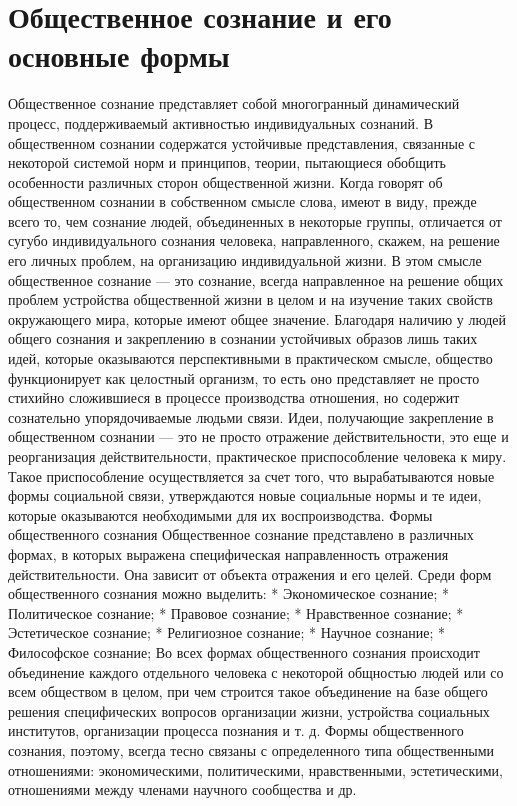 \documentclass[12pt]{article}
\begin{document}
\section{Общественное сознание и его основные формы}
Общественное  сознание  представляет  собой  многогранный  динамический  процесс,  поддерживаемый
активностью  индивидуальных  сознаний.  В  общественном  сознании  содержатся  устойчивые  представления,
связанные с некоторой системой норм и принципов, теории, пытающиеся обобщить особенности различных
сторон общественной жизни. Когда говорят об общественном сознании в собственном смысле слова, имеют в
виду,  прежде  всего  то,  чем  сознание  людей,  объединенных  в  некоторые  группы,  отличается  от  сугубо
индивидуального сознания человека, направленного, скажем, на решение его личных проблем, на организацию
индивидуальной  жизни.  В  этом  смысле  общественное  сознание  —  это  сознание,  всегда  направленное  на
решение общих проблем устройства общественной жизни в целом и на изучение таких свойств окружающего
мира, которые имеют общее значение.
Благодаря наличию у людей общего сознания и закреплению в сознании устойчивых образов лишь таких идей,
которые  оказываются  перспективными  в  практическом  смысле,  общество  функционирует  как  целостный
организм, то есть оно представляет не просто стихийно сложившиеся в процессе производства отношения, но
содержит сознательно упорядочиваемые людьми связи.
Идеи, получающие закрепление в общественном сознании — это не просто отражение действительности, это
еще и реорганизация действительности, практическое приспособление человека к миру. Такое приспособление
осуществляется  за  счет  того,  что  вырабатываются  новые  формы  социальной  связи,  утверждаются  новые
социальные нормы и те идеи, которые оказываются необходимыми для их воспроизводства.
Формы общественного сознания
Общественное  сознание  представлено  в  различных  формах,  в  которых  выражена  специфическая
направленность отражения действительности. Она зависит от объекта отражения и его целей. Среди форм
общественного сознания можно выделить:
* Экономическое сознание;
* Политическое сознание;
* Правовое сознание;
* Нравственное сознание;
* Эстетическое сознание;
* Религиозное сознание;
* Научное сознание;
* Философское сознание;
Во всех формах общественного сознания происходит объединение каждого отдельного человека с некоторой
общностью людей  или со всем  обществом в  целом, при  чем строится такое объединение  на базе  общего
решения  специфических  вопросов  организации  жизни,  устройства  социальных  институтов,  организации
процесса познания и т. д. Формы общественного сознания, поэтому, всегда тесно связаны с определенного типа
общественными  отношениями:  экономическими,  политическими,  нравственными,  эстетическими,
отношениями между членами научного сообщества и др.
\end{document}
